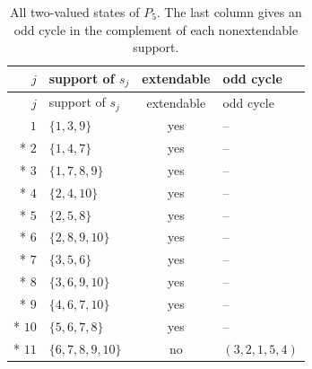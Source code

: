 \documentclass[aps,pra,reprint,superscriptaddress,longbibliography,nofootinbib,floatfix,10pt]{revtex4-2}
\theoremstyle{definition}
\begin{document}
\begingroup\small\setlength{\LTpre}{6pt}\setlength{\LTpost}{8pt}
\begin{longtable}{rlcl}
\caption{All two-valued states of $P_5$. The last column gives an odd cycle in the complement of each nonextendable support.}\label{tab:p5-states}\\
\toprule $j$ & support of $s_j$ & extendable & odd cycle\\\midrule
\endfirsthead
\toprule $j$ & support of $s_j$ & extendable & odd cycle\\\midrule
\endhead
\bottomrule\endfoot
$1$ & $\{1,3,9\}$ & yes & -- \\*
$2$ & $\{1,4,7\}$ & yes & -- \\*
$3$ & $\{1,7,8,9\}$ & yes & -- \\*
$4$ & $\{2,4,10\}$ & yes & -- \\*
$5$ & $\{2,5,8\}$ & yes & -- \\*
$6$ & $\{2,8,9,10\}$ & yes & -- \\*
$7$ & $\{3,5,6\}$ & yes & -- \\*
$8$ & $\{3,6,9,10\}$ & yes & -- \\*
$9$ & $\{4,6,7,10\}$ & yes & -- \\*
$10$ & $\{5,6,7,8\}$ & yes & -- \\*
$11$ & $\{6,7,8,9,10\}$ & no & $(3,2,1,5,4)$ \\
\end{longtable}\endgroup
\end{document}
